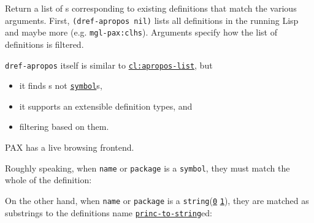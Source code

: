 \begin{itemize}
  Return a list of s
  corresponding to existing definitions that match the various
  arguments. First, \texttt{(dref-apropos\ nil)} lists all definitions
  in the running Lisp and maybe more (e.g. \texttt{mgl-pax:clhs}).
  Arguments specify how the list of definitions is filtered.

  \texttt{dref-apropos} itself is similar to
  \href{http://www.lispworks.com/documentation/HyperSpec/Body/f_apropo.htm}{\texttt{cl:apropos-list}},
  but

  \begin{itemize}
  \item
    it finds
    s
    not
    \href{http://www.lispworks.com/documentation/HyperSpec/Body/t_symbol.htm}{\texttt{symbol}}s,
  \item
    it supports an extensible definition types, and
  \item
    filtering based on them.
  \end{itemize}

  PAX has a live browsing frontend.

  Roughly speaking, when \texttt{name} or \texttt{package} is a
  \texttt{symbol}, they must match the whole
  of the definition:

\begin{Shaded}
\begin{Highlighting}[]
\NormalTok{)}
\end{Highlighting}
\end{Shaded}

  On the other hand, when \texttt{name} or \texttt{package} is a
  \texttt{string}(\href{http://www.lispworks.com/documentation/HyperSpec/Body/t_string.htm}{\texttt{0}}
  \href{http://www.lispworks.com/documentation/HyperSpec/Body/f_string.htm}{\texttt{1}}),
  they are matched as substrings to the definition\textquotesingle s
  name
  \href{http://www.lispworks.com/documentation/HyperSpec/Body/f_wr_to_.htm}{\texttt{princ-to-string}}ed:

\begin{Shaded}
\begin{Highlighting}[]
\NormalTok{)}
\end{Highlighting}
\end{Shaded}


\end{itemize}

